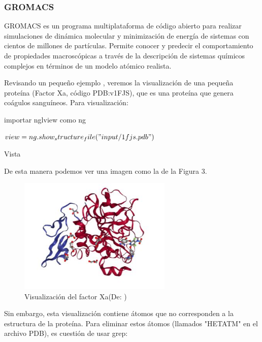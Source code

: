 \documentclass[11pt, letterpaper, spanish]{article}
\begin{document}
{{\subsubsection{GROMACS}
    \par{GROMACS es un programa multiplataforma de código abierto para realizar simulaciones de dinámica molecular y minimización de energía de sistemas con cientos de millones de partículas. Permite conocer y predecir el comportamiento de propiedades macroscópicas a través de la descripción de sistemas químicos complejos en términos de un modelo atómico realista.}
    \par{Revisando un pequeño ejemplo \cite{Villa_2017}, veremos la visualización de una pequeña proteína (Factor Xa, código PDB:v1FJS), que es una proteína que genera coágulos sanguíneos. Para visualización:}
    \\
    \par{importar nglview como ng}
    \par{$view = ng.show_structure_file("input/1fjs.pdb")$}
    \par{Vista}
    \\
    \par{De esta manera podemos ver una imagen como la de la Figura 3.}
\begin{figure}
	    \centering
		\caption{Visualización del factor Xa(De: \cite{Villa_2017})}
		\includegraphics[width=0.65\textwidth]{Proteina.JPG}
	\end{figure}
\par{Sin embargo, esta visualización contiene átomos que no corresponden a la estructura de la proteína. Para eliminar estos átomos (llamados "HETATM" en el archivo PDB), es cuestión de usar grep:}
\vspace{0.5 cm}

}}
\end{document}
